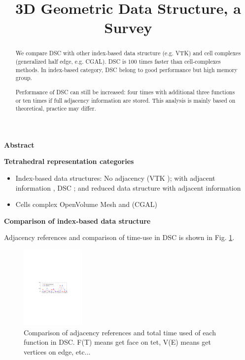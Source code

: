 \documentclass{scrartcl}
\title{3D Geometric Data Structure, a Survey\vspace{-4ex}}
\begin{document}
\maketitle

\textbf{Abstract}
\begin{abstract}
	We compare DSC with other index-based data structure (e.g. VTK) and cell complexes (generalized half edge, e.g. CGAL). DSC is 100 times faster than cell-complexes methods. In index-based category, DSC belong to good performance but high memory group. 
	
	Performance of DSC can still be increased: four times with additional three functions or ten times if full adjacency information are stored. This analysis is mainly based on theoretical, practice may differ.
\end{abstract}

\textbf{Tetrahedral representation categories}

\begin{itemize}
	\setlength\itemsep{0em}
	\item Index-based data structures: No adjacency (VTK \cite{vtk}); with adjacent information \cite{Schroeder1988, Shephard1991}, DSC \cite{Misztal2012}; and reduced data structure with adjacent information \cite{Beall1997, Garimella2002} 
	\item Cells complex OpenVolume Mesh\cite{Kremer2013} and (CGAL) \cite{CGAL} 
\end{itemize}

\textbf{Comparison of index-based data structure}

Adjacency references and comparison of time-use in DSC is shown in Fig. \ref{fig:dsc:stat}.

\begin{figure}[!htb]
	\centering
	\includegraphics[height=11em]{../ref_time}
	\caption{Comparison of adjacency references and total time used of each function in DSC. F(T) means get face on tet, V(E) means get vertices on edge, etc...}
	\label{fig:dsc:stat}
\end{figure}
\end{document}

